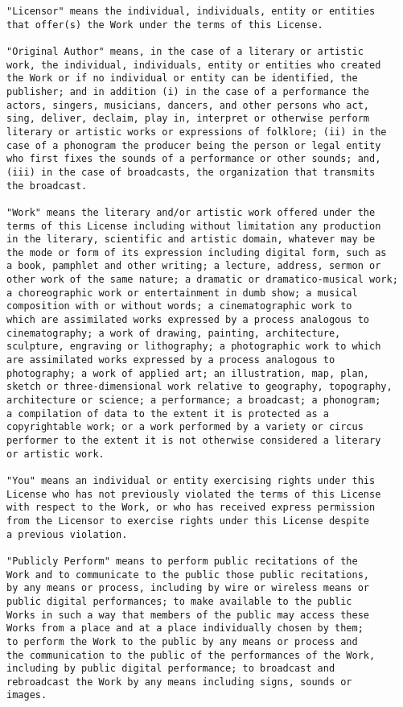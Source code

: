 \begin{verbatim}
"Licensor" means the individual, individuals, entity or entities
that offer(s) the Work under the terms of this License.

"Original Author" means, in the case of a literary or artistic
work, the individual, individuals, entity or entities who created
the Work or if no individual or entity can be identified, the
publisher; and in addition (i) in the case of a performance the
actors, singers, musicians, dancers, and other persons who act,
sing, deliver, declaim, play in, interpret or otherwise perform
literary or artistic works or expressions of folklore; (ii) in the
case of a phonogram the producer being the person or legal entity
who first fixes the sounds of a performance or other sounds; and,
(iii) in the case of broadcasts, the organization that transmits
the broadcast.

"Work" means the literary and/or artistic work offered under the
terms of this License including without limitation any production
in the literary, scientific and artistic domain, whatever may be
the mode or form of its expression including digital form, such as
a book, pamphlet and other writing; a lecture, address, sermon or
other work of the same nature; a dramatic or dramatico-musical work;
a choreographic work or entertainment in dumb show; a musical
composition with or without words; a cinematographic work to
which are assimilated works expressed by a process analogous to
cinematography; a work of drawing, painting, architecture,
sculpture, engraving or lithography; a photographic work to which
are assimilated works expressed by a process analogous to
photography; a work of applied art; an illustration, map, plan,
sketch or three-dimensional work relative to geography, topography,
architecture or science; a performance; a broadcast; a phonogram;
a compilation of data to the extent it is protected as a
copyrightable work; or a work performed by a variety or circus
performer to the extent it is not otherwise considered a literary
or artistic work.

"You" means an individual or entity exercising rights under this
License who has not previously violated the terms of this License
with respect to the Work, or who has received express permission
from the Licensor to exercise rights under this License despite
a previous violation.

"Publicly Perform" means to perform public recitations of the
Work and to communicate to the public those public recitations,
by any means or process, including by wire or wireless means or
public digital performances; to make available to the public
Works in such a way that members of the public may access these
Works from a place and at a place individually chosen by them;
to perform the Work to the public by any means or process and
the communication to the public of the performances of the Work,
including by public digital performance; to broadcast and
rebroadcast the Work by any means including signs, sounds or
images.


\end{verbatim}
